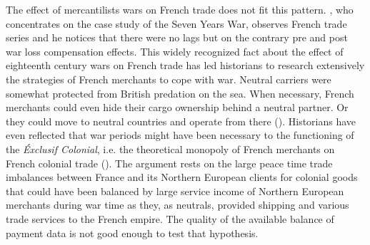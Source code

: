 \documentclass[12pt,a4paper,notitlepage,english]{article}
\begin{document}
The effect of mercantilists wars on French trade does not fit this pattern. \cite{riley_seven_1986}, who concentrates on the case study of the Seven Years War, observes French trade series and he notices that there were no lags but on the contrary pre and post war loss compensation effects. This widely recognized fact about the effect of eighteenth century wars on French trade has led historians to research extensively the strategies of French merchants to cope with war. Neutral carriers were somewhat protected from British predation on the sea. When necessary, French merchants could even hide their cargo ownership behind a neutral partner. Or they could move to neutral countries and operate from there (\cite{marzagalli_was_2016}). Historians have even reflected that war periods might have been necessary to the functioning of the \textit{Éxclusif Colonial}, i.e. the theoretical monopoly of French merchants on French colonial trade (\cite{lespagnol_mondialisation_1997, morineau_vraie_1997, marzagalli_was_2016}). The argument rests on the large peace time trade imbalances between France and its Northern European clients for colonial goods that could have been balanced by large service income of Northern European merchants during war time as they, as neutrals, provided shipping and various trade services to the French empire. The quality of the available balance of payment data is not good enough to test that hypothesis.\\
\end{document}
